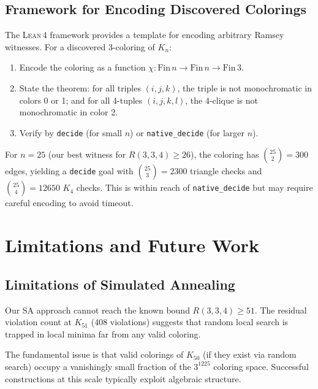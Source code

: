 \documentclass[11pt,a4paper]{article}
\theoremstyle{definition}
\theoremstyle{remark}
\newcommand{\lean}{\textsc{Lean\,4}}
\begin{document}
\subsection{Framework for Encoding Discovered Colorings}\label{sec:lean-framework}

The \lean{} framework provides a template for encoding arbitrary
Ramsey witnesses.  For a discovered 3-coloring of $K_n$:
\begin{enumerate}
  \item Encode the coloring as a function
        $\chi : \text{Fin}\,n \to \text{Fin}\,n \to \text{Fin}\,3$.
  \item State the theorem: for all triples $(i,j,k)$, the triple is
        not monochromatic in colors 0 or 1; and for all 4-tuples
        $(i,j,k,l)$, the 4-clique is not monochromatic in color 2.
  \item Verify by \texttt{decide} (for small $n$) or
        \texttt{native\_decide} (for larger $n$).
\end{enumerate}

For $n = 25$ (our best witness for $R(3,3,4) \ge 26$), the coloring
has $\binom{25}{2} = 300$ edges, yielding a \texttt{decide} goal with
$\binom{25}{3} = 2300$ triangle checks and $\binom{25}{4} = 12650$
$K_4$ checks.  This is within reach of \texttt{native\_decide} but may
require careful encoding to avoid timeout.


\section{Limitations and Future Work}\label{sec:future}

\subsection{Limitations of Simulated Annealing}\label{sec:sa-limits}

Our SA approach cannot reach the known bound $R(3,3,4) \ge 51$.
The residual violation count at $K_{51}$ (408 violations) suggests that
random local search is trapped in local minima far from any valid
coloring.

The fundamental issue is that valid colorings of $K_{50}$ (if they exist
via random search) occupy a vanishingly small fraction of the
$3^{1225}$ coloring space.  Successful constructions at this scale
typically exploit algebraic structure.
\end{document}
